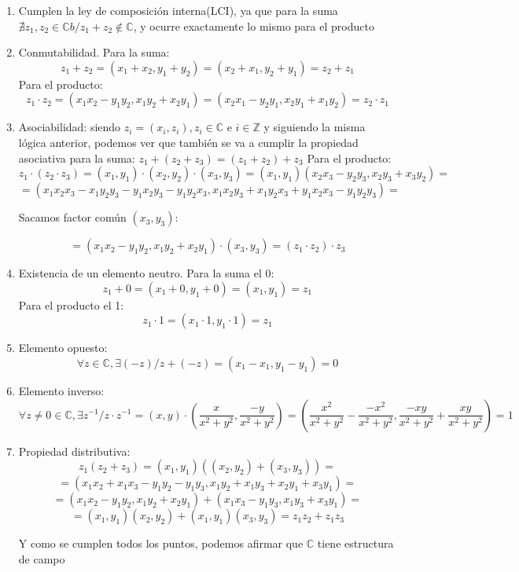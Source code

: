 \documentclass[12pt,a4paper,oneside,onecolumn]{article}
\begin{document}
    \begin{enumerate}
    \item Cumplen la ley de composici\'on interna(LCI), ya que para la suma $\nexists z_1, z_2 \in 	\mathbb{C} b/ z_1 + z_2 \notin \mathbb{C}$, y ocurre exactamente lo mismo para el producto
    
    \item Conmutabilidad. Para la suma:
    \[
    z_1 + z_2 = (x_1+x_2, y_1 + y_2) = (x_2 + x_1, y_2 + y_1) = z_2 + z_1
    \]
    Para el producto:
    \[
        z_1 \cdot z_2 = (x_1x_2 - y_1y_2, x_1y_2 + x_2y_1) = (x_2 x_1 - y_2 y_1, x_2y_1 + x_1 y_2) = z_2 \cdot z_1
    \]
    \item Asociabilidad:
    \newline siendo $z_i = (x_i, z_i), z_i \in \mathbb{C} \text{ e } i \in \mathbb{Z} $ y siguiendo la misma l\'ogica anterior, podemos ver que tambi\'en se va a cumplir la propiedad asociativa para la suma: $z_1 + (z_2 + z_3) = (z_1 + z_2) + z_3$
    Para el producto:
    \[
        z_1 \cdot (z_2 \cdot z_3) = (x_1, y_1) \cdot (x_2, y_2) \cdot (x_3, y_3) = (x_1, y_1) (x_2x_3-y_2y_3, x_2y_3 + x_3y_2) =  
    \]
    \[
        = (x_1x_2x_3 - x_1y_2y_3 - y_1x_2y_3 - y_1y_2x_3, x_1x_2y_3 + x_1y_2x_3 + y_1x_2x_3 - y_1y_2y_3)  =
    \]
    \begin{center}
        Sacamos factor com\'un $(x_3, y_3)$:
    \end{center}
    \[
        = (x_1x_2 - y_1y_2, x_1y_2 + x_2y_1)\cdot(x_3, y_3) = (z_1 \cdot z_2) \cdot z_3
    \]
    
    \item Existencia de un elemento neutro. Para la suma el 0:
    \[
        z_1 + 0 = (x_1 + 0, y_1 + 0) = (x_1, y_1) = z_1
    \]  
    Para el producto el 1:
    \[
        z_1 \cdot 1 = (x_1\cdot 1, y_1\cdot 1) = z_1
    \]
    \item Elemento opuesto:
    \[
        \forall z \in \mathbb{C}, \exists (-z) / z + (-z) = (x_1-x_1, y_1-y_1) = 0
    \]
    \item Elemento inverso:
    \[
        \forall z \ne 0 \in \mathbb{C}, \exists z^{-1} / z \cdot z^{-1} = (x, y)\cdot  (\frac{x}{x^2+y^2}, \frac{-y}{x^2 + y^2}) = (\frac{x^2}{x^2+y^2} - \frac{-x^2}{x^2+y^2}, \frac{-xy}{x^2+y^2} + \frac{xy}{x^2+y^2}) = 1
    \]
    \item Propiedad distributiva:
    \[
        z_1(z_2 + z_3) = (x_1, y_1)((x_2, y_2) + (x_3, y_3)) = 
    \]
    \[
        = (x_1x_2 + x_1x_3 - y_1y_2 - y_1y_3,x_1y_2 + x_1y_3 + x_2y_1 + x_3y_1) =
    \]
    \[
    = (x_1x_2 -y_1y_2, x_1y_2 + x_2y_1) + (x_1x_3 - y_1y_3, x_1y_3 + x_3y_1) =
    \]
    \[
         = (x_1, y_1)(x_2, y_2)+ (x_1, y_1)(x_3, y_3) = z_1z_2 + z_1z_3
    \]
    
    Y como se cumplen todos los puntos, podemos afirmar que $\mathbb{C}$ tiene estructura de campo
    \end{enumerate}
    
\end{document}
